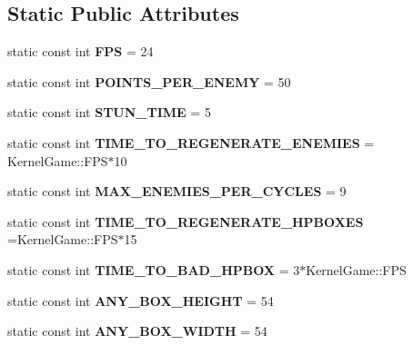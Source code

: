 \subsection*{Static Public Attributes}
\begin{DoxyCompactItemize}
\item 
\hypertarget{class_kernel_game_a39826abf0f1c1dac2d5d7880554fc3f5}{static const int {\bfseries F\-P\-S} = 24}\label{class_kernel_game_a39826abf0f1c1dac2d5d7880554fc3f5}

\item 
\hypertarget{class_kernel_game_a50c001388beca95ededf7b451c92325f}{static const int {\bfseries P\-O\-I\-N\-T\-S\-\_\-\-P\-E\-R\-\_\-\-E\-N\-E\-M\-Y} = 50}\label{class_kernel_game_a50c001388beca95ededf7b451c92325f}

\item 
\hypertarget{class_kernel_game_a82732184131955ddcf19ed23ac8ff1ee}{static const int {\bfseries S\-T\-U\-N\-\_\-\-T\-I\-M\-E} = 5}\label{class_kernel_game_a82732184131955ddcf19ed23ac8ff1ee}

\item 
\hypertarget{class_kernel_game_a675d437b5472685ab56be71d3cabad4f}{static const int {\bfseries T\-I\-M\-E\-\_\-\-T\-O\-\_\-\-R\-E\-G\-E\-N\-E\-R\-A\-T\-E\-\_\-\-E\-N\-E\-M\-I\-E\-S} = Kernel\-Game\-::\-F\-P\-S$\ast$10}\label{class_kernel_game_a675d437b5472685ab56be71d3cabad4f}

\item 
\hypertarget{class_kernel_game_a6fb6f90123c4ad321e1358fd101ab166}{static const int {\bfseries M\-A\-X\-\_\-\-E\-N\-E\-M\-I\-E\-S\-\_\-\-P\-E\-R\-\_\-\-C\-Y\-C\-L\-E\-S} = 9}\label{class_kernel_game_a6fb6f90123c4ad321e1358fd101ab166}

\item 
\hypertarget{class_kernel_game_a30ec2e5873f5d310826a0c56f9743997}{static const int {\bfseries T\-I\-M\-E\-\_\-\-T\-O\-\_\-\-R\-E\-G\-E\-N\-E\-R\-A\-T\-E\-\_\-\-H\-P\-B\-O\-X\-E\-S} =Kernel\-Game\-::\-F\-P\-S$\ast$15}\label{class_kernel_game_a30ec2e5873f5d310826a0c56f9743997}

\item 
\hypertarget{class_kernel_game_a692c5bb0576ed461c8e83261aa4f407c}{static const int {\bfseries T\-I\-M\-E\-\_\-\-T\-O\-\_\-\-B\-A\-D\-\_\-\-H\-P\-B\-O\-X} = 3$\ast$Kernel\-Game\-::\-F\-P\-S}\label{class_kernel_game_a692c5bb0576ed461c8e83261aa4f407c}

\item 
\hypertarget{class_kernel_game_a4481548e4416ba164f867e3f1400b2ec}{static const int {\bfseries A\-N\-Y\-\_\-\-B\-O\-X\-\_\-\-H\-E\-I\-G\-H\-T} = 54}\label{class_kernel_game_a4481548e4416ba164f867e3f1400b2ec}

\item 
\hypertarget{class_kernel_game_a76023e94d4cc0df01ddda95f0d9c200d}{static const int {\bfseries A\-N\-Y\-\_\-\-B\-O\-X\-\_\-\-W\-I\-D\-T\-H} = 54}\label{class_kernel_game_a76023e94d4cc0df01ddda95f0d9c200d}

\end{DoxyCompactItemize}


